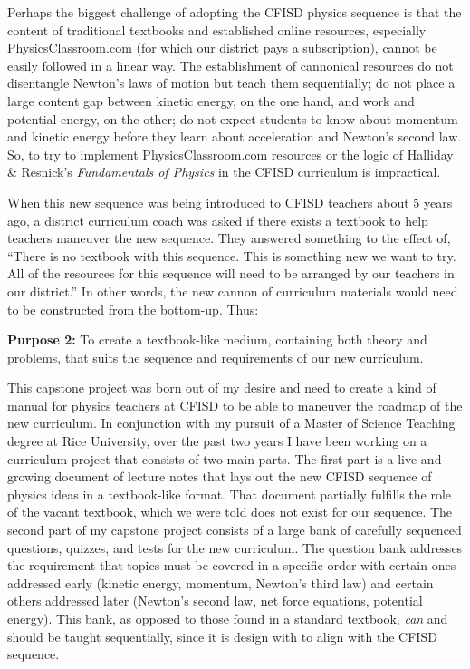 \documentclass[12pt]{article}
\begin{document}
Perhaps the biggest challenge of adopting the CFISD physics sequence is that the content of traditional textbooks and established online resources, especially PhysicsClassroom.com (for which our district pays a subscription), cannot be easily followed in a linear way. The establishment of cannonical resources do not disentangle Newton's laws of motion but teach them sequentially; do not place a large content gap between kinetic energy, on the one hand, and work and potential energy, on the other; do not expect students to know about momentum and kinetic energy before they learn about acceleration and Newton's second law. So, to try to implement PhysicsClassroom.com resources or the logic of Halliday \& Resnick's \textit{Fundamentals of Physics} in the CFISD curriculum is impractical. 

When this new sequence was being introduced to CFISD teachers about 5 years ago, a district curriculum coach was asked if there exists a textbook to help teachers maneuver the new sequence. They answered something to the effect of, ``There is no textbook with this sequence. This is something new we want to try. All of the resources for this sequence will need to be arranged by our teachers in our district.'' In other words, the new cannon of curriculum materials would need to be constructed from the bottom-up. Thus:

\begin{mdframed}[backgroundcolor=black!20]
    \textbf{Purpose 2:} To create a textbook-like medium, containing both theory and problems, that suits the sequence and requirements of our new curriculum.
\end{mdframed}

This capstone project was born out of my desire and need to create a kind of manual for physics teachers at CFISD to be able to maneuver the roadmap of the new curriculum. In conjunction with my pursuit of a Master of Science Teaching degree at Rice University, over the past two years I have been working on a curriculum project that consists of two main parts. The first part is a live and growing document of lecture notes that lays out the new CFISD sequence of physics ideas in a textbook-like format. That document partially fulfills the role of the vacant textbook, which we were told does not exist for our sequence. The second part of my capstone project consists of a large bank of carefully sequenced questions, quizzes, and tests for the new curriculum. The question bank addresses the requirement that topics must be covered in a specific order with certain ones addressed early (kinetic energy, momentum, Newton's third law) and certain others addressed later (Newton's second law, net force equations, potential energy). This bank, as opposed to those found in a standard textbook, \textit{can} and should be taught sequentially, since it is design with to align with the CFISD sequence.
\end{document}
